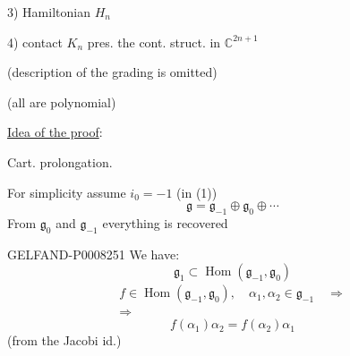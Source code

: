 3) Hamiltonian \(H_n\)

4) contact \(K_n\) \qquad pres. the cont. struct. in \(\mathbb{C}^{2n+1}\)

(description of the grading is omitted)

(all are polynomial)

\uline{Idea of the proof}:

Cart. prolongation.

For simplicity assume \(i_0=-1\) (in (1))
\begin{equation*}
\mathfrak g=\mathfrak g_{-1}\oplus\mathfrak g_0\oplus\cdots\tag{6}
\end{equation*}
From \(\mathfrak g_0\) and \(\mathfrak g_{-1}\) everything is recovered


\begin{GelfandAdjacentEvidence}{GELFAND-P000825}{1}
We have:
\begin{equation*}
\mathfrak g_1\subset\operatorname{Hom}(\mathfrak g_{-1},\mathfrak g_0)\tag{7}
\end{equation*}
\[
\begin{gathered}
f\in\operatorname{Hom}(\mathfrak g_{-1},\mathfrak g_0),\quad
\alpha_1,\alpha_2\in\mathfrak g_{-1}\quad\Rightarrow\\
\Rightarrow
\end{gathered}
\]
\begin{equation*}
f(\alpha_1)\alpha_2=f(\alpha_2)\alpha_1\tag{8}
\end{equation*}
(from the Jacobi id.)
\end{GelfandAdjacentEvidence}
